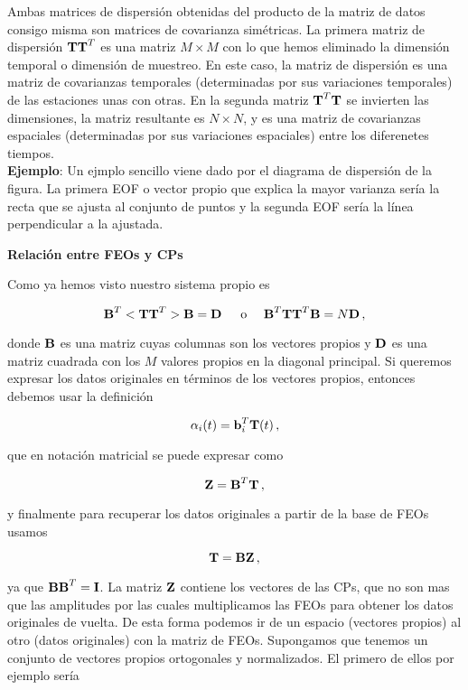 \documentclass[
]{agujournal2019}
\begin{document}
Ambas matrices de dispersión obtenidas del producto de la matriz de
datos consigo misma son matrices de covarianza simétricas. La primera
matriz de dispersión \({\textbf T}{\textbf T}^T\) es una matriz
\(M \times M\) con lo que hemos eliminado la dimensión temporal o
dimensión de muestreo. En este caso, la matriz de dispersión es una
matriz de covarianzas temporales (determinadas por sus variaciones
temporales) de las estaciones unas con otras. En la segunda matriz
\({\textbf T}^T{\textbf T}\) se invierten las dimensiones, la matriz
resultante es \(N\times N\), y es una matriz de covarianzas espaciales
(determinadas por sus variaciones espaciales) entre los diferenetes
tiempos.\\

\textbf{Ejemplo}: Un ejmplo sencillo viene dado por el diagrama de
dispersión de la figura. La primera EOF o vector propio que explica la
mayor varianza sería la recta que se ajusta al conjunto de puntos y la
segunda EOF sería la línea perpendicular a la ajustada.

\begin{center}
\end{center}

\vspace{0.25cm}

\textbf{Relación entre FEOs y CPs}

Como ya hemos visto nuestro sistema propio es

\[{\textbf B}^T<{\textbf T}{\textbf T}^T>{\textbf B}={\textbf D}\,\,\,\,\,\,\,\,\,{\rm o}\,\,\,\,\,\,\,\,{\textbf B}^T{\textbf T}{\textbf T}^T{\textbf B}=N{\textbf D}\,,\]

donde \({\textbf B}\) es una matriz cuyas columnas son los vectores
propios y \({\textbf D}\) es una matriz cuadrada con los \(M\) valores
propios en la diagonal principal. Si queremos expresar los datos
originales en términos de los vectores propios, entonces debemos usar la
definición

\[\alpha_i(t)={\textbf b}^T_{i}{\textbf T}(t)\,,\]

que en notación matricial se puede expresar como

\[{\textbf Z}={\textbf B}^T{\textbf T}\,,\]

y finalmente para recuperar los datos originales a partir de la base de
FEOs usamos

\[{\textbf T}={\textbf B}{\textbf Z}\,,\]

ya que \({\textbf B}{\textbf B}^T={\textbf I}\). La matriz
\({\textbf Z}\) contiene los vectores de las CPs, que no son mas que las
amplitudes por las cuales multiplicamos las FEOs para obtener los datos
originales de vuelta. De esta forma podemos ir de un espacio (vectores
propios) al otro (datos originales) con la matriz de FEOs. Supongamos
que tenemos un conjunto de vectores propios ortogonales y normalizados.
El primero de ellos por ejemplo sería
\end{document}
